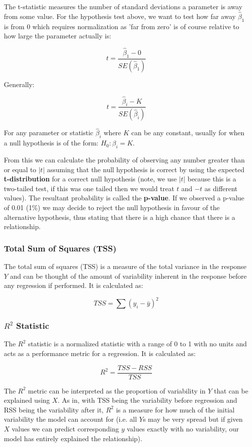 The t-statistic measures the number of standard deviations a parameter is away from some value. For the hypothesis test above, we want to test how far away $\hat{\beta}_{1}$ is from 0 which requires normalization as 'far from zero' is of course relative to how large the parameter actually is:

$$ t = \frac{\hat{\beta}_{1} - 0}{SE(\hat{\beta}_{1})} $$

Generally:

$$ t = \frac{\hat{\beta}_{i} - K}{SE(\hat{\beta}_{i})} $$

For any parameter or statistic $\hat{\beta}_{i}$ where $K$ can be any constant, usually for when a null hypothesis is of the form: $H_{0}: \beta_{i} = K$.

From this we can calculate the probability of observing any number greater than or equal to $|t|$ assuming that the null hypothesis is correct by using the expected \textbf{t-distribution} for a correct null hypothesis (note, we use $|t|$ because this is a two-tailed test, if this was one tailed then we would treat $t$ and $-t$ as different values). The resultant probability is called the \textbf{p-value}. If we observed a p-value of 0.01 (1\%) we may decide to reject the null hypothesis in favour of the alternative hypothesis, thus stating that there is a high chance that there is a relationship.

\subsubsection{Total Sum of Squares (TSS)}

The total sum of squares (TSS) is a measure of the total variance in the response $Y$ and can be thought of the amount of variability inherent in the response before any regression if performed. It is calculated as:

$$ TSS = \sum(y_{i} - \bar{y})^{2} $$

\subsubsection{$R^{2}$ Statistic}

The $R^{2}$ statistic is a normalized statistic with a range of 0 to 1 with no units and acts as a performance metric for a regression. It is calculated as:

$$ R^{2} = \frac{TSS-RSS}{TSS} $$

The $R^{2}$ metric can be interpreted as the proportion of variability in $Y$ that can be explained using $X$. As in, with TSS being the variability before regression and RSS being the variability after it, $R^{2}$ is a measure for how much of the initial variability the model can account for (i.e. all $Y$s may be very spread but if given $X$ values we can predict corresponding $y$ values exactly with no variability, our model has entirely explained the relationship).

